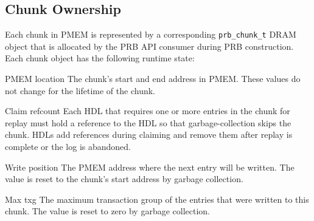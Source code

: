 \documentclass[12pt,a4paper,twoside]{book}
\begin{document}
\subsection{Chunk Ownership}\label{prb:di:chunkownership}

Each chunk in PMEM is represented by a corresponding \lstinline{prb_chunk_t} DRAM object that is allocated by the PRB API consumer during PRB construction.
Each chunk object has the following runtime state:
\begin{description}[noitemsep]
    \item[PMEM location] The chunk's start and end address in PMEM. These values do not change for the lifetime of the chunk.
    \item[Claim refcount] Each HDL that requires one or more entries in the chunk for replay must hold a reference to the HDL so that garbage-collection skips the chunk.
        HDLs add references during claiming and remove them after replay is complete or the log is abandoned.
    \item[Write position] The PMEM address where the next entry will be written. The value is reset to the chunk's start address by garbage collection.
    \item[Max txg] The maximum transaction group of the entries that were written to this chunk. The value is reset to zero by garbage collection.
\end{description}
\end{document}
